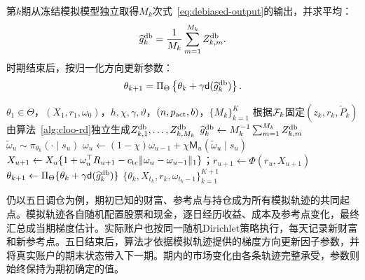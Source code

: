 第$k$期从冻结模拟模型独立取得$M_k$次式~\eqref{eq:debiased-output}的输出，并求平均：
\begin{equation}\label{eq:gradient-average}
 \widehat g_k^{\mathrm{db}}
 =\frac1{M_k}\sum_{m=1}^{M_k}Z_{k,m}^{\mathrm{db}}.
\end{equation}
时期结束后，按归一化方向更新参数：
\begin{equation}\label{eq:parameter-update}
 \theta_{k+1}
 =\Pi_\Theta\left\{\theta_k+\gamma\mathsf d(\widehat g_k^{\mathrm{db}})\right\}.
\end{equation}

\begin{algorithm}[H]
\caption{动态参考点CPT策略梯度（\DRCPTPG）}\label{alg:drcptpg}
\begin{minipage}{0.88\linewidth}
\begin{algorithmic}[1]
\REQUIRE $\theta_1\in\Theta$，$(X_1,r_1,\omega_0)$，$h,\chi,\gamma,\vartheta$，$(n,p_{\rm act},b)$，$\{M_k\}_{k=1}^{K}$
    \STATE 根据$\mathcal F_k$固定$(z_k,r_k,\widetilde P_k)$
    \STATE 由算法~\ref{alg:cloo-rd}独立生成$Z_{k,1}^{\mathrm{db}},\ldots,Z_{k,M_k}^{\mathrm{db}}$
    \STATE $\widehat g_k^{\mathrm{db}}\gets M_k^{-1}\sum_{m=1}^{M_k}Z_{k,m}^{\mathrm{db}}$
        \STATE $\widetilde\omega_u\sim\pi_{\theta_k}(\cdot\mid s_u)$
        \STATE $\omega_u\gets(1-\chi)\omega_{u-1}+\chi\mathsf M_u(\widetilde\omega_u\mid s_u)$
        \STATE $X_{u+1}\gets X_u\{1+\omega_u^\top R_{u+1}-c_{\rm tc}\lVert\omega_u-\omega_{u-1}\rVert_1\}$；$r_{u+1}\gets\Phi(r_u,X_{u+1})$
    \ENDFOR
    \STATE $\theta_{k+1}\gets\Pi_\Theta\{\theta_k+\gamma\mathsf d(\widehat g_k^{\mathrm{db}})\}$
\ENDFOR
\RETURN $\{\theta_k,X_{t_k},r_k,\omega_{t_k-1}\}_{k=1}^{K+1}$
\end{algorithmic}
\end{minipage}
\end{algorithm}

仍以五日调仓为例，期初已知的财富、参考点与持仓成为所有模拟轨迹的共同起点。模拟轨迹各自随机配置股票和现金，逐日经历收益、成本及参考点变化，最终汇总成当期梯度估计。实际账户也按同一随机Dirichlet策略执行，每天记录新财富和新参考点。五日结束后，算法才依据模拟轨迹提供的梯度方向更新因子参数，并将真实账户的期末状态带入下一期。期内的市场变化由各条轨迹完整承受，参数则始终保持为期初确定的值。
